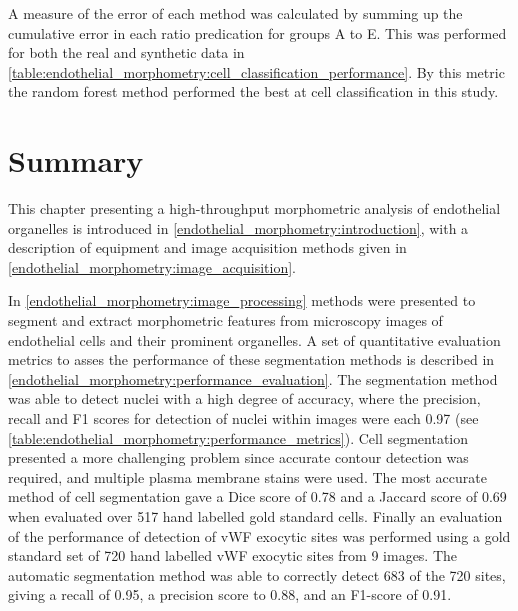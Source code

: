 A measure of the error of each method was calculated by summing up the cumulative error in each ratio predication for groups A to E. This was performed for both the real and synthetic data in \autoref{table:endothelial_morphometry:cell_classification_performance}. By this metric the random forest method performed the best at cell classification in this study.

\section{Summary}
\label{endothelial_morphometry:summary}
This chapter presenting a high-throughput morphometric analysis of endothelial organelles is introduced in \autoref{endothelial_morphometry:introduction}, with a description of equipment and image acquisition methods given in \autoref{endothelial_morphometry:image_acquisition}.

In \autoref{endothelial_morphometry:image_processing} methods were presented to segment and extract morphometric features from microscopy images of endothelial cells and their prominent organelles. A set of quantitative evaluation metrics to asses the performance of these segmentation methods is described in \autoref{endothelial_morphometry:performance_evaluation}. The segmentation method was able to detect nuclei with a high degree of accuracy, where the precision, recall and F1 scores for detection of nuclei within images were each 0.97 (see \autoref{table:endothelial_morphometry:performance_metrics}). Cell segmentation presented a more challenging problem since accurate contour detection was required, and multiple plasma membrane stains were used. The most accurate method of cell segmentation gave a Dice score of 0.78 and a Jaccard score of 0.69 when evaluated over 517 hand labelled gold standard cells. Finally an evaluation of the performance of detection of vWF exocytic sites was performed using a gold standard set of 720 hand labelled vWF exocytic sites from 9 images. The automatic segmentation method was able to correctly detect 683 of the 720 sites, giving a recall of 0.95, a precision score to 0.88, and an F1-score of 0.91.

